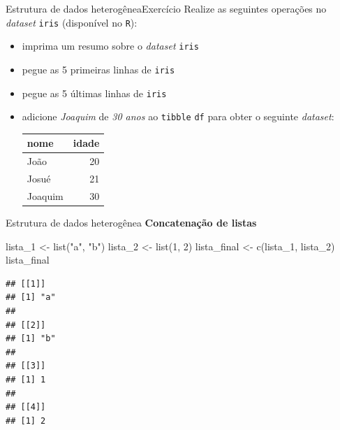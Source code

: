 \documentclass[
  10pt,
  ignorenonframetext,
]{beamer}
\newenvironment{Shaded}{}{}
\newcommand{\DecValTok}[1]{#1}
\newcommand{\KeywordTok}[1]{\textcolor[rgb]{0.00,0.00,1.00}{#1}}
\newcommand{\NormalTok}[1]{#1}
\newcommand{\StringTok}[1]{\textcolor[rgb]{0.00,0.50,0.50}{#1}}
\providecommand{\tightlist}{%
  \setlength{\itemsep}{0pt}\setlength{\parskip}{0pt}}
\begin{document}
\begin{frame}[fragile]{Estrutura de dados heterogênea\newline Exercício}
\protect\hypertarget{estrutura-de-dados-heteroguxeaneaexercuxedcio-1}{}
Realize as seguintes operações no \emph{dataset} \texttt{iris}
(disponível no \texttt{R}):

\begin{itemize}
\tightlist
\item
  imprima um resumo sobre o \emph{dataset} \texttt{iris}
\item
  pegue as 5 primeiras linhas de \texttt{iris}
\item
  pegue as 5 últimas linhas de \texttt{iris}
\item
  adicione \emph{Joaquim} de \emph{30 anos} ao \texttt{tibble}
  \texttt{df} para obter o seguinte \emph{dataset}:

  \begin{longtable}{lr}
  \toprule
  nome & idade \\ 
  \midrule
  João & 20 \\ 
  Josué & 21 \\ 
  Joaquim & 30 \\ 
  \bottomrule
  \end{longtable}
\end{itemize}
\end{frame}

\begin{frame}[fragile]{Estrutura de dados heterogênea}
\protect\hypertarget{estrutura-de-dados-heteroguxeanea-3}{}
\textbf{Concatenação de listas}

\begin{Shaded}
\begin{Highlighting}[]
\NormalTok{lista\_}\DecValTok{1}\NormalTok{  \textless{}{-}}\StringTok{ }\KeywordTok{list}\NormalTok{(}\StringTok{"a"}\NormalTok{, }\StringTok{"b"}\NormalTok{)}
\NormalTok{lista\_}\DecValTok{2}\NormalTok{ \textless{}{-}}\StringTok{ }\KeywordTok{list}\NormalTok{(}\DecValTok{1}\NormalTok{, }\DecValTok{2}\NormalTok{)}
\NormalTok{lista\_final \textless{}{-}}\StringTok{ }\KeywordTok{c}\NormalTok{(lista\_}\DecValTok{1}\NormalTok{, lista\_}\DecValTok{2}\NormalTok{)}
\NormalTok{lista\_final}
\end{Highlighting}
\end{Shaded}

\begin{verbatim}
## [[1]]
## [1] "a"
## 
## [[2]]
## [1] "b"
## 
## [[3]]
## [1] 1
## 
## [[4]]
## [1] 2
\end{verbatim}
\end{frame}
\end{document}
